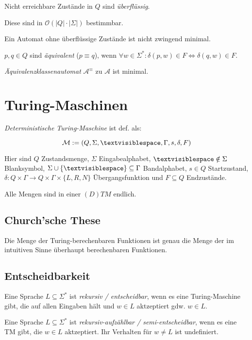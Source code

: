 Nicht erreichbare Zustände in $Q$ sind \emph{überflüssig}.

Diese sind in $\mathcal{O}(|Q|\cdot|\Sigma|)$ bestimmbar.

Ein Automat ohne überflüssige Zustände ist nicht zwingend minimal.

$p, q \in Q$ sind \emph{äquivalent} ($p \equiv q$), wenn $\forall w \in \Sigma^* : \delta(p,w) \in F \iff \delta(q,w) \in F$.

\emph{Äquivalenzklassenautomat} $\mathcal{A}^\equiv$ zu $\mathcal{A}$ ist minimal.

\section*{Turing-Maschinen}

\emph{Deterministische Turing-Maschine} ist def. als:

\vspace*{-2mm}
\[ \mathcal{M} := (Q,\Sigma,\textvisiblespace,\Gamma,s,\delta,F) \]

Hier sind $Q$ Zustandsmenge, $\Sigma$ Eingabealphabet, $\textvisiblespace \notin \Sigma$ Blanksymbol, $\Sigma \cup \{\textvisiblespace\} \subseteq \Gamma$ Bandalphabet, $s \in Q$ Startzustand, $\delta : Q \times \Gamma \to Q \times \Gamma \times \{L,R,N\}$ Übergangsfunktion und $F \subseteq Q$ Endzustände.

Alle Mengen sind in einer $(D)TM$ endlich.

\subsection*{Church'sche These}

Die Menge der Turing-berechenbaren Funktionen ist genau die Menge der im intuitiven Sinne überhaupt berechenbaren Funktionen.

\subsection*{Entscheidbarkeit}

Eine Sprache $L \subseteq \Sigma^*$ ist \emph{rekursiv / entscheidbar}, wenn es eine Turing-Maschine gibt, die auf allen Eingaben hält und $w \in L$ aktzeptiert gdw. $w \in L$.

\spacing

Eine Sprache $L \subseteq \Sigma^*$ ist \emph{rekursiv-aufzählbar / semi-entscheidbar}, wenn es eine TM gibt, die $w \in L$ aktzeptiert. Ihr Verhalten für $w \neq L$ ist undefiniert.

